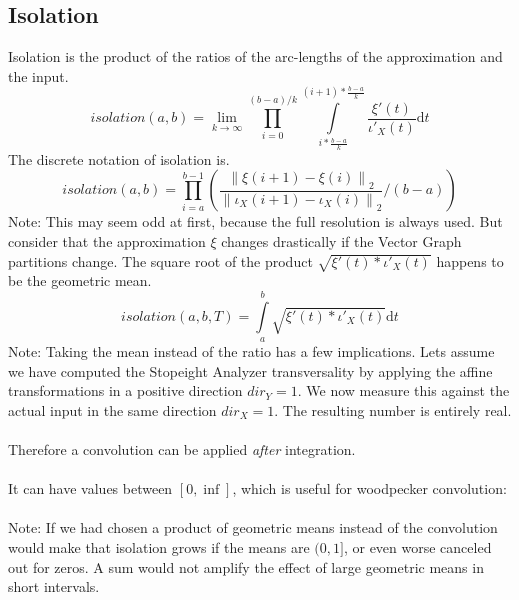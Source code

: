 \documentclass{report}
\newcommand\norm[1]{\left\lVert#1\right\rVert}
\begin{document}
\subsection{Isolation}
Isolation is the product of the ratios of the arc-lengths of the approximation and the input.
\begin{equation}
isolation(a,b)=\lim _{k\rightarrow\infty} \prod _{i=0}^{(b-a)/k} \int \limits _{i*\frac{b-a}{k}}^{(i+1)*\frac{b-a}{k}} \frac{\xi'(t)}{\iota'_{X}(t)} \mathrm{d}t
\end{equation}
The discrete notation of isolation is.
\begin{equation}
isolation(a,b)= \prod _{i=a}^{b-1} (\frac{\norm{\xi(i+1)-\xi(i)}_{2}}{\norm{\iota_{X}(i+1)-\iota_{X}(i)}_{2}}/(b-a))
\end{equation}
Note: This may seem odd at first, because the full resolution is always used. But consider that the approximation $\xi$ changes drastically if the Vector Graph partitions change.
The square root of the product $\sqrt{\xi'(t)*\iota'_{X}(t)}$ happens to be the geometric mean.
\begin{equation}
isolation(a,b,T)=\int \limits _{a}^{b} \sqrt{\xi'(t)*\iota'_{X}(t)} \mathrm{d}t
\end{equation}
Note: Taking the mean instead of the ratio has a few implications. Lets assume we have computed the Stopeight Analyzer transversality by applying the affine transformations in a positive direction $dir_{Y}=1$. We now measure this against the actual input in the same direction $dir_{X}=1$. The resulting number is entirely real.\\\\
Therefore a convolution can be applied \emph{after} integration.\\\\
It can have values between $[0,\inf]$, which is useful for woodpecker convolution:\\\\
Note: If we had chosen a product of geometric means instead of the convolution would make that isolation grows if the means are $(0,1]$, or even worse canceled out for zeros. A sum would not amplify the effect of large geometric means in short intervals.
\end{document}
